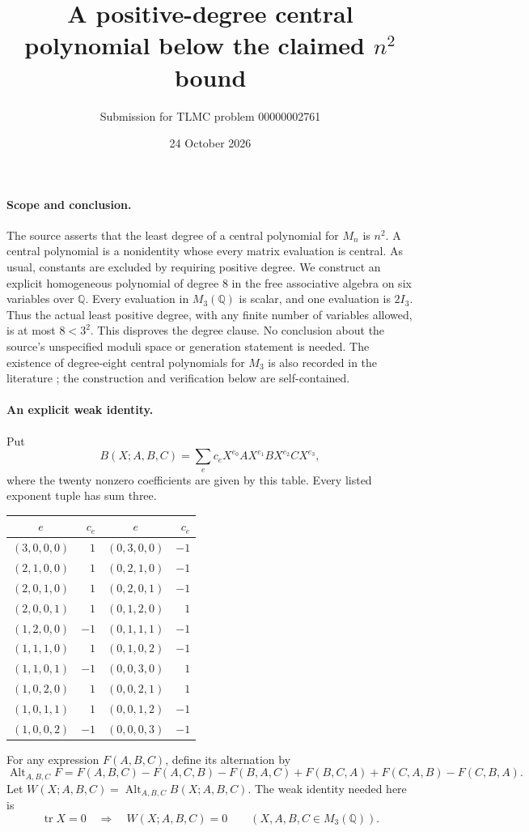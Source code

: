 \documentclass[11pt,a4paper]{article}
\title{A positive-degree central polynomial below the claimed $n^2$ bound}
\author{Submission for TLMC problem 00000002761}
\date{24 October 2026}
\newcommand{\Q}{\mathbb Q}
\newcommand{\Mat}{M_3(\Q)}
\newcommand{\Alt}{\operatorname{Alt}_{A,B,C}}
\begin{document}
\maketitle

\paragraph{Scope and conclusion.}
The source asserts that the least degree of a central polynomial for
$M_n$ is $n^2$. A central polynomial is a nonidentity whose every matrix
evaluation is central. As usual, constants are excluded by requiring
positive degree. We construct an explicit homogeneous polynomial of
degree $8$ in the free associative algebra on six variables over $\Q$.
Every evaluation in $\Mat$ is scalar, and one evaluation is $2I_3$.
Thus the actual least positive degree, with any finite number of
variables allowed, is at most $8<3^2$. This disproves the degree clause.
No conclusion about the source's unspecified moduli space or generation
statement is needed. The existence of degree-eight central polynomials
for $M_3$ is also recorded in the literature \cite{dk,drensky}; the
construction and verification below are self-contained.

\paragraph{An explicit weak identity.}
Put
\[
B(X;A,B,C)=\sum_e c_e X^{e_0}A X^{e_1}B X^{e_2}C X^{e_3},
\]
where the twenty nonzero coefficients are given by this table. Every
listed exponent tuple has sum three.
\begin{center}
\begin{tabular}{c r@{\qquad\qquad}c r}
$e$ & $c_e$ & $e$ & $c_e$\\\hline
$(3,0,0,0)$&$1$&$(0,3,0,0)$&$-1$\\
$(2,1,0,0)$&$1$&$(0,2,1,0)$&$-1$\\
$(2,0,1,0)$&$1$&$(0,2,0,1)$&$-1$\\
$(2,0,0,1)$&$1$&$(0,1,2,0)$&$1$\\
$(1,2,0,0)$&$-1$&$(0,1,1,1)$&$-1$\\
$(1,1,1,0)$&$1$&$(0,1,0,2)$&$-1$\\
$(1,1,0,1)$&$-1$&$(0,0,3,0)$&$1$\\
$(1,0,2,0)$&$1$&$(0,0,2,1)$&$1$\\
$(1,0,1,1)$&$1$&$(0,0,1,2)$&$-1$\\
$(1,0,0,2)$&$-1$&$(0,0,0,3)$&$-1$
\end{tabular}
\end{center}
For any expression $F(A,B,C)$, define its alternation by
\[
\Alt F=F(A,B,C)-F(A,C,B)-F(B,A,C)
 +F(B,C,A)+F(C,A,B)-F(C,B,A).
\]
Let $W(X;A,B,C)=\Alt B(X;A,B,C)$. The weak identity needed here is
\begin{equation}\label{weak}
\operatorname{tr}X=0\quad\Longrightarrow\quad W(X;A,B,C)=0
\qquad(X,A,B,C\in\Mat).
\end{equation}
\end{document}
